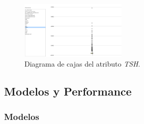\documentclass[osajnl,twocolumn,showpacs,superscriptaddress,10pt,floatfix]{revtex4-1} %
\begin{document}
\begin{figure}[H]
    \centering
    \includegraphics[width=0.45\textwidth]{analysis/box_plot_TSH}
    \caption{Diagrama de cajas del atributo \textit{TSH}.}
    \label{figure:box_plot_TSH}
\end{figure}

\onecolumngrid

\clearpage

\subsection{Modelos y Performance}

\subsubsection{Modelos} \label{apendix:models:models}
\end{document}
